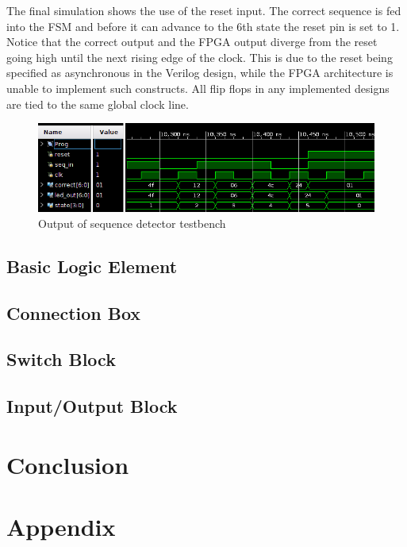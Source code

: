 \documentclass[12pt]{article}
\begin{document}
The final simulation shows the use of the reset input. The correct sequence is fed into
the FSM and before it can advance to the 6th state the reset pin is set to 1. Notice that
the correct output and the FPGA output diverge from the reset going high until the next
rising edge of the clock. This is due to the reset being specified as asynchronous in the
Verilog design, while the FPGA architecture is unable to implement such constructs. All
flip flops in any implemented designs are tied to the same global clock line.

\begin{figure}[H]
    \centering
    \includegraphics[width=1\textwidth]{reset}
    \caption{Output of sequence detector testbench}
    \label{fig:reset}
\end{figure}

\subsection{Basic Logic Element}

\subsection{Connection Box}

\subsection{Switch Block}

\subsection{Input/Output Block}

\newpage
\section{Conclusion}

\newpage
{}


\newpage
\section{Appendix}
\end{document}
